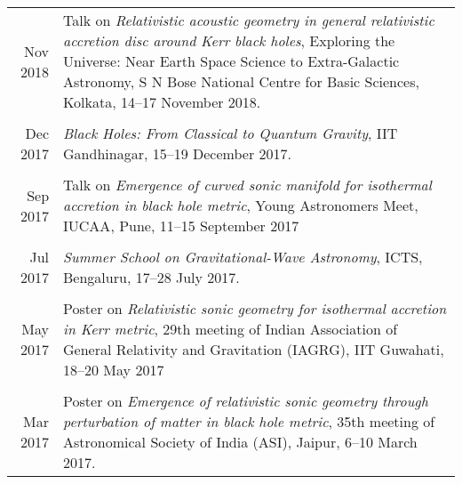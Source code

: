 \documentclass[10pt]{article}
\begin{document}
\begin{longtable}{rp{14cm}}
Nov 2018 & {Talk} on {\itshape Relativistic acoustic geometry in general relativistic accretion disc around Kerr black holes}, Exploring the Universe: Near Earth Space Science to Extra-Galactic Astronomy, S N Bose National Centre for Basic Sciences, Kolkata, 14--17 November 2018.\\\\

Dec 2017 & {\itshape Black Holes: From Classical to Quantum Gravity}, IIT Gandhinagar, 15--19 December 2017.\\\\

Sep 2017 & {Talk} on {\itshape Emergence of curved sonic manifold for isothermal accretion in black hole metric}, Young Astronomers Meet, IUCAA, Pune, 11--15 September 2017\\\\

Jul 2017 & {\itshape Summer School on Gravitational-Wave Astronomy}, ICTS, Bengaluru, 17--28 July 2017.\\\\

May 2017 & {Poster} on {\itshape Relativistic sonic geometry for isothermal accretion in Kerr metric}, 29th meeting of Indian Association of General Relativity and Gravitation (IAGRG), IIT Guwahati, 18--20 May 2017\\\\

Mar 2017 & {Poster} on {\itshape Emergence of relativistic sonic geometry through perturbation of matter in black hole metric}, 35th meeting of Astronomical Society of India (ASI), Jaipur, 6--10 March 2017.
\end{longtable}
\end{document}
